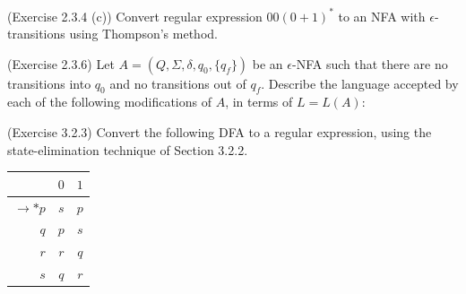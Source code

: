 \documentclass[10pt]{homework}
\begin{document}
\begin{problem} (Exercise 2.3.4 (c)) Convert regular expression $00{(0+1)}^{*}$
  to an NFA with \(\epsilon\)-transitions using Thompson's method.
\end{problem}

\begin{solution}

\end{solution}

\begin{problem} (Exercise 2.3.6)
  Let $A = (Q, \Sigma, \delta, q_{0}, \{q_{f}\})$ be an $\epsilon$-NFA such that
  there are no transitions into $q_{0}$ and no transitions out of $q_{f}$.
  Describe the language accepted by each of the following modifications of $A$,
  in terms of $L = L(A)$:
\end{problem}

\begin{solution}

\end{solution}

\begin{problem} (Exercise 3.2.3)
  Convert the following DFA to a regular expression, using the state-elimination
  technique of Section 3.2.2.
  \begin{table}[h]
    \centering
    \begin{tabular}{r||c|c} %
      & $0$ & $1$\\\hline\hline %
      $\rightarrow * p$ & $s$ & $p$\\
      $q$ & $p$ & $s$\\
      $r$ & $r$ & $q$\\
      $s$ & $q$ & $r$
    \end{tabular}
  \end{table}
\end{problem}
\end{document}
